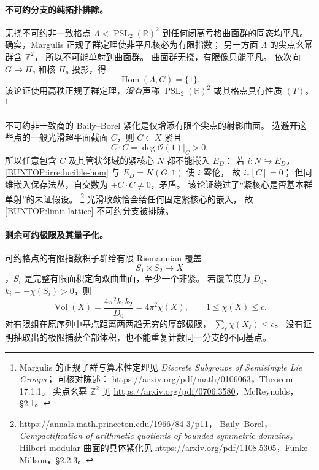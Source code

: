 \documentclass[UTF8,fontset=fandol,zihao=-4,oneside,openany]{ctexbook}
\theoremstyle{cjkplain}
\numberwithin{equation}{chapter}
\begin{document}
\paragraph{不可约分支的纯拓扑排除。}
无挠不可约非一致格点
\(\Lambda<\operatorname{PSL}_2(\mathbb R)^2\)
到任何闭高亏格曲面群的同态均平凡。
确实，Margulis 正规子群定理使非平凡核必为有限指数；
另一方面 \(\Lambda\) 的尖点幺幂群含 \(\mathbb Z^2\)，
所以不可能单射到曲面群。
曲面群无挠，有限像只能平凡。
依次向 \(G\to\Pi_q\) 和核 \(\Pi_p\) 投影，得
\begin{equation}
 \operatorname{Hom}(\Lambda,G)=\{1\}.
 \label{BUNTOP:irreducible-hom}
\end{equation}
该论证使用高秩正规子群定理，\emph{没有}声称
\(\operatorname{PSL}_2(\mathbb R)^2\) 或其格点具有性质 \((T)\)。%
\footnote{Margulis 的正规子群与算术性定理见
\emph{Discrete Subgroups of Semisimple Lie Groups}；
可核对陈述：
\url{https://arxiv.org/pdf/math/0106063}，Theorem 17.1.1。
尖点幺幂 \(\mathbb Z^2\) 见
\url{https://arxiv.org/pdf/0706.3580}，McReynolds，§2.1。}

不可约非一致商的 Baily--Borel 紧化是仅增添有限个尖点的射影曲面。
选避开这些点的一般光滑超平面截面 \(C\)，则 \(C\subset X\) 紧且
\[
 C\cdot C=\deg\mathcal O(1)|_C>0 .
\]
所以任意包含 \(C\) 及其管状邻域的紧核心 \(N\) 都不能嵌入 \(E_D\)：
若 \(i:N\hookrightarrow E_D\)，
\eqref{BUNTOP:irreducible-hom} 与 \(E_D=K(G,1)\) 使 \(i\) 零伦，
故 \(i_*[C]=0\)；
但同维嵌入保存法丛，自交数为 \(\pm C\cdot C\ne0\)，矛盾。
该论证绕过了“紧核心是否基本群单射”的未证假设。%
\footnote{\url{https://annals.math.princeton.edu/1966/84-3/p11}，
Baily--Borel，\emph{Compactification of arithmetic quotients of bounded symmetric domains}。
Hilbert modular 曲面的具体紧化见
\url{https://arxiv.org/pdf/1108.5305}，Funke--Millson，§2.2.3。}
光滑收敛恰会给任何固定紧核心的嵌入，
故 \eqref{BUNTOP:limit-lattice} 不可约分支被排除。

\paragraph{剩余可约极限及其量子化。}
可约格点的有限指数积子群给有限 Riemannian 覆盖
\[
 S_1\times S_2\longrightarrow X
\]
，\(S_i\) 是完整有限面积定向双曲曲面，至少一个非紧。
若覆盖度为 \(D_0\)、\(k_i=-\chi(S_i)>0\)，则
\begin{equation}
 \operatorname{Vol}(X)
 =\frac{4\pi^2 k_1k_2}{D_0}
 =4\pi^2\chi(X),\qquad
 1\le\chi(X)\le c .
 \label{BUNTOP:quantized-limit}
\end{equation}
对有限组在原序列中基点距离两两趋无穷的厚部极限，
\(\sum_\ell\chi(X_\ell)\le c\)。
没有证明抽取出的极限捕获全部体积，也不能重复计数同一分支的不同基点。
\end{document}
